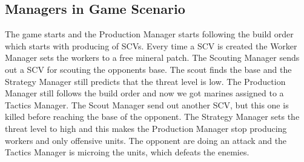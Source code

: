 	\subsection{Managers in Game Scenario}
		The game starts and the Production Manager starts following the build order which starts with producing of SCVs. Every time a SCV is created the 
		Worker Manager sets the workers to a free mineral patch. The Scouting Manager sends out a SCV for scouting the opponents base. The scout 
		finds the base and the Strategy Manager still predicts that the threat level is low. The Production Manager still follows the build order and now 
		we got marines assigned to a Tactics Manager. The Scout Manager send out another SCV, but this one is killed before reaching the base of the 
		opponent. The Strategy Manager sets the threat level to high and this makes the Production Manager stop producing workers and only offensive units. 
		The opponent are doing an attack and the Tactics Manager is microing the units, which defeats the enemies.
